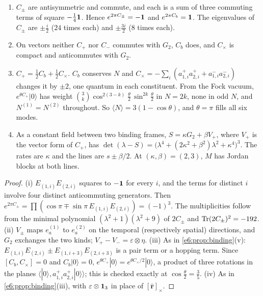 \begin{proposition}
\label{e6:prop:copyrot}
\begin{enumerate}[label=(\roman*),leftmargin=2.2em]
\item $C_\pm$ are antisymmetric and commute, and each is a sum of three commuting terms of square $-\tfrac14\mathbf 1$. Hence $e^{2\pi C_\pm}=-\mathbf 1$ and $e^{2\pi C_b}=\mathbf 1$.
The eigenvalues of $C_\pm$ are $\pm\tfrac i2$ ($24$ times each) and $\pm\tfrac{3i}2$ ($8$ times each).
\item On vectors neither $C_+$ nor $C_-$ commutes with $G_2$, $C_b$ does, and $C_\times$ is compact and anticommutes with $G_2$.
\item $C_+=\tfrac12C_b+\tfrac12C_\times$. $C_b$ conserves $N$ and $C_\times=-\sum_i(a^+_{1,i}a^+_{2,i}+a^-_{1,i}a^-_{2,i})$ changes it by $\pm2$, one quantum in each
constituent. From the Fock vacuum, $e^{\theta C_+}|0\rangle$ has weight $\binom3k\cos^{2(3-k)}\tfrac\theta2\,\sin^{2k}\tfrac\theta2$ in $N=2k$, none in odd $N$,
and $N^{(1)}=N^{(2)}$ throughout. So $\langle N\rangle=3(1-\cos\theta)$, and $\theta=\pi$ fills all six modes.
\item As a constant field between two binding frames, $S=\kappa G_2+\beta V_+$, where $V_+$ is the vector form of $C_+$, has
$\det(\lambda-S)=\bigl(\lambda^4+(2\kappa^2+\beta^2)\lambda^2+\kappa^4\bigr)^3$. The rates are $\kappa$ and the lines are $s\pm\beta/2$. At $(\kappa,\beta)=(2,3)$, $M$ has Jordan blocks
at both lines.
\end{enumerate}
\end{proposition}

\begin{proof}
(i) $E_{(1,i)}E_{(2,i)}$ squares to $-\mathbf 1$ for every $i$, and the terms for distinct $i$ involve four distinct anticommuting generators. Then
$e^{2\pi C_\pm}=\prod(\cos\pi\mp\sin\pi\,E_{(1,i)}E_{(2,i)})=(-1)^3$. The multiplicities follow from the minimal polynomial $(\lambda^2+1)(\lambda^2+9)$ of
$2C_\pm$ and $\operatorname{Tr}(2C_\pm)^2=-192$. (ii) $V_\pm$ maps $e^{(1)}_a$ to $e^{(2)}_a$ on the temporal (respectively spatial) directions, and $G_2$ exchanges the two
kinds; $V_+-V_-=\varepsilon\otimes\eta$. (iii) As in \cref{e6:prop:binding}(v): $E_{(1,i)}E_{(2,i)}\pm E_{(1,i+3)}E_{(2,i+3)}$ is a pair term or a hopping term. Since
$[C_b,C_\times]=0$ and $C_b|0\rangle=0$, $e^{\theta C_+}|0\rangle=e^{\theta C_\times/2}|0\rangle$, a product of three rotations in the planes
$\langle|0\rangle,a^+_{1,i}a^+_{2,i}|0\rangle\rangle$; this is checked exactly at $\cos\tfrac\theta2=\tfrac35$. (iv) As in \cref{e6:prop:binding}(iii), with
$\varepsilon\otimes\mathbf 1_3$ in place of $[\hat{\mathbf r}]_\times$.
\end{proof}

